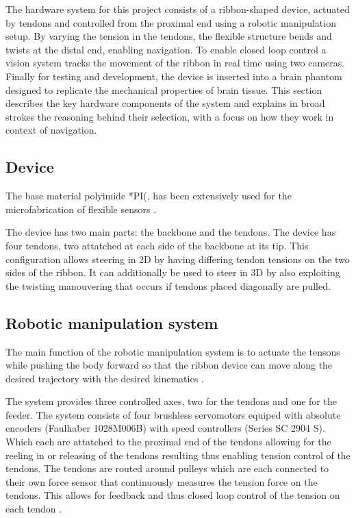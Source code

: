 The hardware system for this project consists of a ribbon-shaped device, actuated by tendons and controlled from the proximal end using a robotic manipulation setup. By varying the tension in the tendons, the flexible structure bends and twists at the distal end, enabling navigation. To enable closed loop control a vision system tracks the movement of the ribbon in real time using two cameras. Finally for testing and development, the device is inserted into a brain phantom designed to replicate the mechanical properties of brain tissue. This section describes the key hardware components of the system and explains in broad strokes the reasoning behind their selection, with a focus on how they work in context of navigation.


\subsection{Device}


The base material polyimide *PI(, has been extensively used for the microfabrication of flexible sensors \cite{noseda_flat_2024}.

The device has two main parts: the backbone and the tendons. The device has four tendons, two attatched at each side of the backbone at its tip. This configuration allows steering in 2D by having differing tendon tensions on the two sides of the ribbon. It can additionally be used to steer in 3D by also exploiting the twisting manouvering that occurs if tendons placed diagonally are pulled.


\subsection{Robotic manipulation system}
The main function of the robotic manipulation system is to actuate the tensons while pushing the body forward so that the ribbon device can move along the desired trajectory with the desired kinematics \cite{noseda_flat_2024}. 

The system provides three controlled axes, two for the tendons and one for the feeder. The system consists of four brushless servomotors equiped with absolute encoders (Faulhaber 1028M006B) with speed controllers (Series SC 2904 S). Which each are attatched to the proximal end of the tendons allowing for the reeling in or releasing of the tendons resulting thus enabling tension control of the tendons. The tendons are routed around pulleys which are each connected to their own force sensor  that continuously measures the tension force on the tendons. This allows for feedback and thus closed loop control of the tension on each tendon . 

